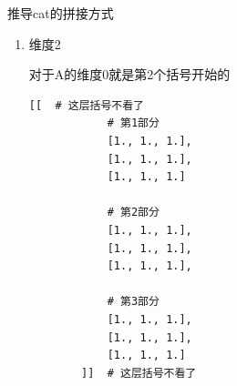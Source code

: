 \begin{derivation}{推导cat的拼接方式}
\begin{enumerate}[label=\arabic*)]
\begin{lstlisting}[style=demostyle,numbers=none]
            # 第2部分
            [[1., 1., 1.],
             [1., 1., 1.],
             [1., 1., 1.]],

            # 第3部分
            [[1., 1., 1.],
             [1., 1., 1.],
             [1., 1., 1.]]
        ]    # 这层括号不看了
        \end{lstlisting}
        同理B的维度0就是第1个括号开始的
        \begin{lstlisting}[style=demostyle,numbers=none]
        [   # 这层括号不看了
            # 第1部分
            [[2., 2., 2.],
             [2., 2., 2.],
             [2., 2., 2.]]

            # 第2部分
            [[2., 2., 2.],
             [2.,2., 2.],
             [2., 2., 2.]],
            
            # 第3部分
            [[2., 2., 2.],
             [2., 2., 2.],
             [2., 2., 2.]]
        ]   # 这层括号不看了
        \end{lstlisting}

        在维度1上拼接就是将A和B的第1个括号拼接在一起
        \begin{lstlisting}[style=demostyle,numbers=none]
        [   # 这层括号不看了
            [[1., 1., 1.],
             [1., 1., 1.],
             [1., 1., 1.],
             [2., 2., 2.],
             [2., 2., 2.],
             [2., 2., 2.]],

            [[1., 1., 1.],
             [1., 1., 1.],
             [1., 1., 1.],
             [2., 2., 2.],
             [2., 2., 2.],
             [2., 2., 2.]],

            [[1., 1., 1.],
             [1., 1., 1.],
             [1., 1., 1.],
             [2., 2., 2.],
             [2., 2., 2.],
             [2., 2., 2.]]
        ]    # 这层括号不看了
        \end{lstlisting}

        \item 维度2

        对于A的维度0就是第2个括号开始的
        \begin{lstlisting}[style=demostyle,numbers=none]
        [[  # 这层括号不看了
            # 第1部分
            [1., 1., 1.],
            [1., 1., 1.],
            [1., 1., 1.]

            # 第2部分
            [1., 1., 1.],
            [1., 1., 1.],
            [1., 1., 1.],

            # 第3部分
            [1., 1., 1.],
            [1., 1., 1.],
            [1., 1., 1.]
        ]]  # 这层括号不看了
        \end{lstlisting}


\end{enumerate}
\end{derivation}
